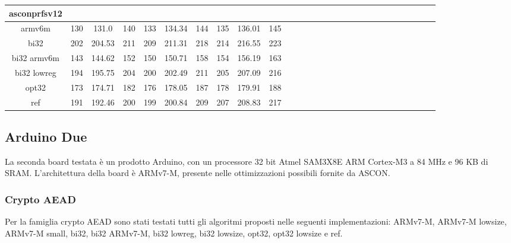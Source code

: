 \begin{landscape}
\begin{table}[]
\begin{adjustbox}{width=600pt}
\begin{tabular}{|c|c|c|c|c|c|c|c|c|c|c|c|c|c|c|c|c|c|c|c|c|c|c|c|c|c|c|c|}
				\hline
                asconprfsv12 & & & & & & & & & & & & & & & & & & & & & & & & & & & \\
				\hline
				armv6m & 130 & 131.0 & 140 & 133 & 134.34 & 144 & 135 & 136.01 & 145 & & & & & & & & & & & & & & & & & &\\
				\hline
				bi32 & 202 & 204.53 & 211 & 209 & 211.31 & 218 & 214 & 216.55 & 223 & & & & & & & & & & & & & & & & & & \\
				\hline
				bi32 armv6m & 143 & 144.62 & 152 & 150 & 150.71 & 158 & 154 & 156.19 & 163 & & & & & & & & & & & & & & & & & & \\
				\hline
				bi32 lowreg & 194 & 195.75 & 204 & 200 & 202.49 & 211 & 205 & 207.09 & 216 & & & & & & & & & & & & & & & & & & \\
				\hline
				opt32 & 173 & 174.71 & 182 & 176 & 178.05 & 187 & 178 & 179.91 & 188 & & & & & & & & & & & & & & & & & & \\
				\hline
				ref & 191 & 192.46 & 200 & 199 & 200.84 & 209 & 207 & 208.83 & 217 & & & & & & & & & & & & & & & & & & \\
				\hline
			\end{tabular}
		\end{adjustbox}
	\end{table}
\end{landscape}

\subsection{Arduino Due}

La seconda board testata è un prodotto Arduino, con un processore 32 bit Atmel SAM3X8E ARM Cortex-M3 a 84 MHz e 96 KB di SRAM\cite{arduino}. L'architettura della board è ARMv7-M, presente nelle ottimizzazioni possibili fornite da ASCON\cite{arm}.

\subsubsection{Crypto AEAD}

Per la famiglia crypto AEAD sono stati testati tutti gli algoritmi proposti nelle seguenti implementazioni: ARMv7-M, ARMv7-M lowsize, ARMv7-M small, bi32, bi32 ARMv7-M, bi32 lowreg, bi32 lowsize, opt32, opt32 lowsize e ref.

